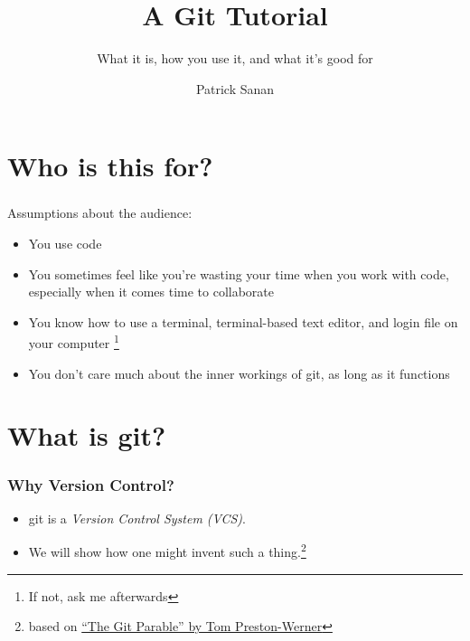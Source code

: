 \documentclass{beamer}
\author{Patrick Sanan}
\institute[USI/ETHZ] 
{
USI Lugano ICS / ETH Z\"{u}rich ERDW\\
}
\title{A Git Tutorial}
\subtitle[]{What it is, how you use it, and what it's good for}
\date[]{}
\begin{document}

\begin{frame}[fragile]
\titlepage 
\end{frame}


\begin{frame}
\tableofcontents 
\end{frame}

\section{Who is this for?}
\begin{frame}[fragile]
\frametitle{}
Assumptions about the audience:
\begin{itemize}
\item You use code
\item You sometimes feel like you're wasting your time when you work with code, especially when it comes time to collaborate
\item You know how to use a terminal, terminal-based text editor, and login file on your computer \footnote{If not, ask me afterwards}
\item You don't care much about the inner workings of git, as long as it functions
\end{itemize}
\end{frame}



\section{What is git?}
\begin{frame}[fragile]
\frametitle{Why Version Control?}
\begin{itemize}
\item
git is a \emph{Version Control System (VCS)}.
\item 
We will show how one might invent such a thing.\footnote{based on \href{http://tom.preston-werner.com/2009/05/19/the-git-parable.html}{``The Git Parable'' by Tom Preston-Werner}}
\end{itemize}
\end{frame}
\end{document}
